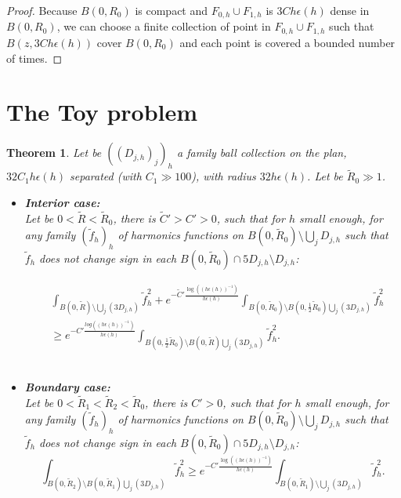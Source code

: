 \documentclass[leqno,11pt,letterpaper, english]{amsart}
\newcommand{\nn}{\nonumber}
\theoremstyle{plain}
\newtheorem{thm}{Theorem}
\theoremstyle{definition}
\numberwithin{equation}{section}
\begin{document}
\begin{proof}
		Because $B(0,R_0)$ is compact and $F_{0,h}\cup F_{1,h}$ is $3Ch\epsilon(h)$ dense in $B(0,R_0)$, we can choose a finite collection of point in $F_{0,h}\cup F_{1,h}$ such that $B(z,3Ch\epsilon(h))$ cover $B(0,R_0)$ and each point is covered a bounded number of times. 
	\end{proof}
\section{The Toy problem}
\label{subsect: Toy problem}
\begin{thm}
	Let be $((D_{j,h})_j)_h$ a family ball collection on the plan, $32C_1 h\epsilon(h)$ separated (with $C_1\gg 100$), with radius $32h\epsilon(h)$. Let be $\tilde{R}_0\gg1$.  
	\begin{itemize}
		\item \textbf{Interior case:}\\
		Let be $0<\tilde{R}<\tilde{R}_0$,
		there is $\tilde{C}'>C'>0$, such that for $h$ small enough, for any family $(\tilde{f}_h)_h$ of harmonics functions on $B(0,\tilde{R}_0)\setminus \bigcup_j D_{j,h}$  such that $\tilde{f}_h$ does not change sign in each $B(0,\tilde{R}_0)\cap 5D_{j,h}\setminus D_{j,h}$:
		
		\begin{align}
			&\int_{B(0,\tilde{R})\setminus \bigcup_j(3D_{j,h})} \tilde{f}_h^2+e^{-\tilde{C}'\frac{\log \left((h\epsilon(h))^{-1}\right)}{h\epsilon(h)}}\int_{B(0,\tilde{R}_0)\setminus B(0,\frac{1}{2}\tilde{R}_0)\bigcup_j (3D_{j,h})} \tilde{f}_h^2 \nn\\
			&\geq e^{-C'\frac{log\left((h\epsilon(h))^{-1}\right)}{h\epsilon(h)}}\int_{B(0,\frac{1}{2}\tilde{R}_0)\setminus B(0,\tilde{R})\bigcup_j(3D_{j,h})} \tilde{f}_h^2 .
		\end{align}
		\hfill\\
		\item \textbf{Boundary case:}\\
		Let be $0<\tilde{R}_1<\tilde{R}_2<\tilde{R}_0$, there is $C'>0$, such that for $h$ small enough, for any family $(\tilde{f}_h)_h$ of harmonics functions on $B(0,\tilde{R}_0)\setminus \bigcup_j D_{j,h}$ such that $\tilde{f}_h$ does not change sign in each $B(0,\tilde{R}_0)\cap 5D_{j,h}\setminus D_{j,h}$:
		\begin{equation}
			\int_{B(0,\tilde{R}_2)\setminus B(0,\tilde{R}_1)\bigcup_j(3D_{j,h})} \tilde{f}_h^2\geq e^{-C'\frac{\log \left((h\epsilon(h))^{-1}\right)}{h\epsilon(h)}}\int_{B(0,\tilde{R}_1)\setminus \bigcup_j(3D_{j,h})} \tilde{f}_h^2. 
		\end{equation}
	\end{itemize}
\end{thm}
	
\end{document}
